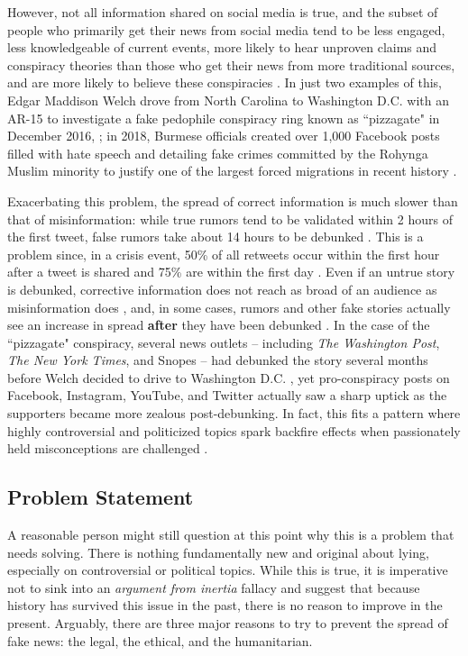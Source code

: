 \documentclass[preprint,review,12pt]{elsarticle}
\begin{document}
However, not all information shared on social media is true, and the subset of people who primarily get their news from social media tend to be less engaged, less knowledgeable of current events, more likely to hear unproven claims and conspiracy theories than those who get their news from more traditional sources, and are more likely to believe these conspiracies \cite{mitchell2020americans}. In just two examples of this, Edgar Maddison Welch drove from North Carolina to Washington D.C. with an AR-15 to investigate a fake pedophile conspiracy ring known as ``pizzagate" in December 2016, \cite{goldman2016comet}; in 2018, Burmese officials created over 1,000 Facebook posts filled with hate speech and detailing fake crimes committed by the Rohynga Muslim minority to justify one of the largest forced migrations in recent history \cite{subedar2018country}.

Exacerbating this problem, the spread of correct information is much slower than that of misinformation: while true rumors tend to be validated within 2 hours of the first tweet, false rumors take about 14 hours to be debunked \cite{zubiaga2016analysing,shao2016hoaxy}. This is a problem since, in a crisis event, 50\% of all retweets occur within the first hour after a tweet is shared and 75\% are within the first day \cite{kwak2010twitter}. Even if an untrue story is debunked, corrective information does not reach as broad of an audience as misinformation does \cite{maddock2015characterizing, vosoughi2018spread}, and, in some cases, rumors and other fake stories actually see an increase in spread \textbf{after} they have been debunked \cite{starbird2014rumors}. In the case of the ``pizzagate" conspiracy, several news outlets -- including \textit{The Washington Post}, \textit{The New York Times}, and Snopes -- had debunked the story several months before Welch decided to drive to Washington D.C. \cite{kang2016fake,lacapria2016fact,board_2016}, yet pro-conspiracy posts on Facebook, Instagram, YouTube, and Twitter actually saw a sharp uptick as the supporters became more zealous post-debunking\cite{kang2016washington}. In fact, this fits a pattern where highly controversial and politicized topics spark backfire effects when passionately held misconceptions are challenged \cite{gollust2009polarizing,nyhan2010corrections,nyhan2013hazards,redlawsk2010affective,schaffner2016misinformation,hart2012boomerang}.

\subsection{Problem Statement}
\label{Problem Statement}
A reasonable person might still question at this point why this is a problem that needs solving. There is nothing fundamentally new and original about lying, especially on controversial or political topics. While this is true, it is imperative not to sink into an \textit{argument from inertia} fallacy \cite{bennett2012logically} and suggest that because history has survived this issue in the past, there is no reason to improve in the present. Arguably, there are three major reasons to try to prevent the spread of fake news: the legal, the ethical, and the humanitarian.
\end{document}
